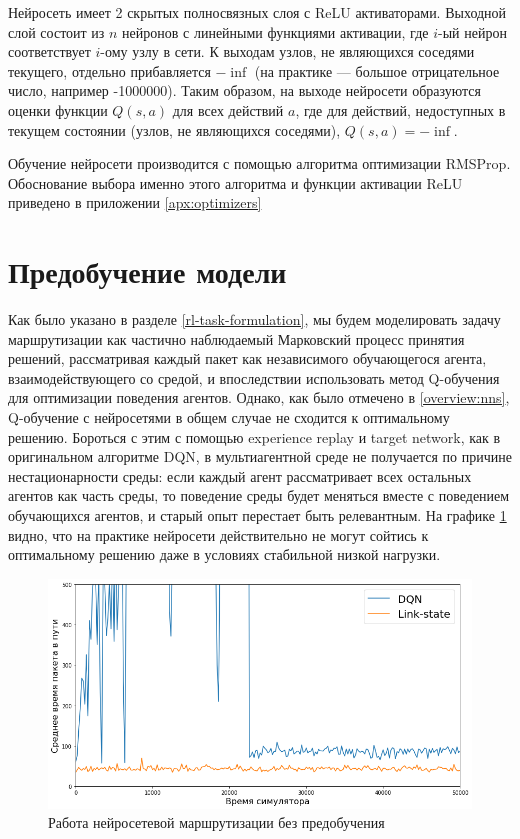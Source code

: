 \documentclass[specification, annotation]{itmo-student-thesis}
\begin{document}
Нейросеть имеет 2 скрытых полносвязных слоя с ReLU активаторами. Выходной слой
состоит из $n$ нейронов с линейными функциями активации, где $i$-ый нейрон
соответствует $i$-ому узлу в сети. К выходам узлов, не являющихся соседями
текущего, отдельно прибавляется $-\inf$ (на практике --- большое отрицательное
число, например -1000000). Таким образом, на выходе нейросети образуются оценки
функции $Q(s, a)$ для всех действий $a$, где для действий, недоступных в текущем
состоянии (узлов, не являющихся соседями), $Q(s, a) = -\inf$.

Обучение нейросети производится с помощью алгоритма оптимизации
RMSProp\cite{tieleman2012lecture}. Обоснование выбора именно этого алгоритма и
функции активации ReLU приведено в приложении \ref{apx:optimizers}

\section{Предобучение модели}

Как было указано в разделе \ref{rl-task-formulation}, мы будем моделировать
задачу маршрутизации как частично наблюдаемый Марковский процесс принятия
решений, рассматривая каждый пакет как независимого обучающегося агента,
взаимодействующего со средой, и впоследствии использовать метод Q-обучения для
оптимизации поведения агентов. Однако, как было отмечено в \ref{overview:nns},
Q-обучение с нейросетями в общем случае не сходится к оптимальному решению.
Бороться с этим с помощью experience replay и target network, как в оригинальном
алгоритме DQN, в мультиагентной среде не получается по причине
нестационарности среды: если каждый агент рассматривает всех остальных агентов
как часть среды, то поведение среды будет меняться вместе с поведением
обучающихся агентов, и старый опыт перестает быть релевантным. На графике
\ref{non-convergence} видно, что на практике нейросети действительно не могут
сойтись к оптимальному решению даже в условиях стабильной низкой нагрузки.

\begin{figure}[!h]
  \caption{Работа нейросетевой маршрутизации без
    предобучения}\label{non-convergence}
  \centering
  \includegraphics[scale=0.6]{non-convergence}
\end{figure}
\end{document}
